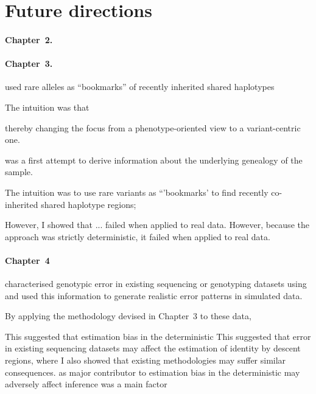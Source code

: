 \section{Future directions}







\paragraph{Chapter~2.}








\paragraph{Chapter~3.}



used rare alleles as ``bookmarks'' of recently inherited shared haplotypes

The intuition was that

thereby changing the focus from a phenotype-oriented view to a variant-centric one.

was a first attempt to derive information about the underlying genealogy of the sample.

The intuition was to use rare variants as ``'bookmarks' to find recently co-inherited shared haplotype regions;

However, I showed that ... failed when applied to real data.
However, because the approach was strictly deterministic, it failed when applied to real data.


\paragraph{Chapter~4}
characterised genotypic error in existing sequencing or genotyping datasets using
and used this information to generate realistic error patterns in simulated data.

By applying the methodology devised in Chapter~3 to these data,

This suggested that estimation bias in the deterministic
This suggested that error in existing sequencing datasets may affect the estimation of identity by descent regions, where I also showed that existing methodologies may suffer similar consequences.
as major contributor to estimation bias in the deterministic
may adversely affect inference
was a main factor

